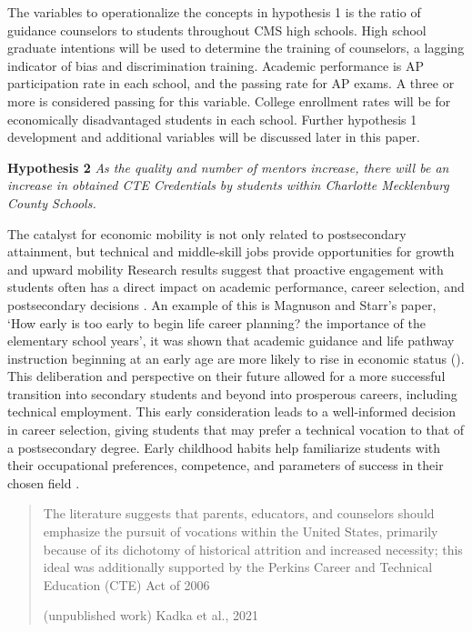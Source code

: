 The variables to operationalize the concepts in hypothesis 1 is the ratio of guidance counselors to students throughout CMS high schools. 
High school graduate intentions will be used to determine the training of counselors, a lagging indicator of bias and discrimination training. 
Academic performance is AP participation rate in each school, and the passing rate for AP exams. 
A three or more is considered passing for this variable. College enrollment rates will be for economically disadvantaged students in each school. 
Further hypothesis 1 development and additional variables will be discussed later in this paper.


\textbf{Hypothesis 2} \textit{As the quality and number of mentors increase, there will be an increase in obtained CTE Credentials by students within Charlotte Mecklenburg County Schools.}

The catalyst for economic mobility is not only related to postsecondary attainment, but technical and middle-skill jobs provide opportunities for growth and upward mobility \parencite[][p. 27]{LOO}
Research results suggest that proactive engagement with students often has a direct impact on academic performance, career selection, and postsecondary decisions \parencite[][]{lee1993}. 
An example of this is Magnuson and Starr's paper, `How early is too early to begin life career planning? the importance of the elementary school years', it was shown that academic guidance and life pathway instruction beginning at an early age are more likely to rise in economic status (). 
This deliberation and perspective on their future allowed for a more successful transition into secondary students and beyond into prosperous careers, including technical employment.
This early consideration leads to a well-informed decision in career selection, giving students that may prefer a technical vocation to that of a postsecondary degree. 
Early childhood habits help familiarize students with their occupational preferences, competence, and parameters of success in their chosen field \parencite[][]{magnuson2000}.

\blockquote[(unpublished work) Kadka et al., 2021]{
    The literature suggests that parents, educators, and counselors should emphasize the pursuit of vocations within the United States, primarily because of its dichotomy of historical attrition and increased necessity; 
    this ideal was additionally supported by the Perkins Career and Technical Education (CTE) Act of 2006 \parencite{castellano2017}}


